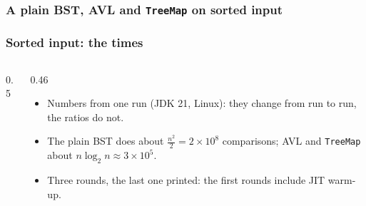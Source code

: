 \documentclass[aspectratio=169,10pt,compress]{beamer}
\begin{document}
\begin{frame}[t,fragile] \frametitle{A plain BST, AVL and \texttt{TreeMap} on sorted input}
\end{frame}




\begin{frame}[t,fragile] \frametitle{Sorted input: the times}
  \begin{columns}[T]
    \begin{column}{0.5\textwidth}
    \end{column}
    \begin{column}{0.46\textwidth}
      \begin{itemize}\small
        \item Numbers from one run (JDK 21, Linux): they change from run to run, the ratios do not.
        \item The plain BST does about $\frac{n^{2}}{2} = 2 \times 10^{8}$ comparisons; AVL and \texttt{TreeMap} about $n \log_{2} n \approx 3 \times 10^{5}$.
        \item Three rounds, the last one printed: the first rounds include JIT warm-up.
      \end{itemize}
    \end{column}
  \end{columns}
\end{frame}

\end{document}
